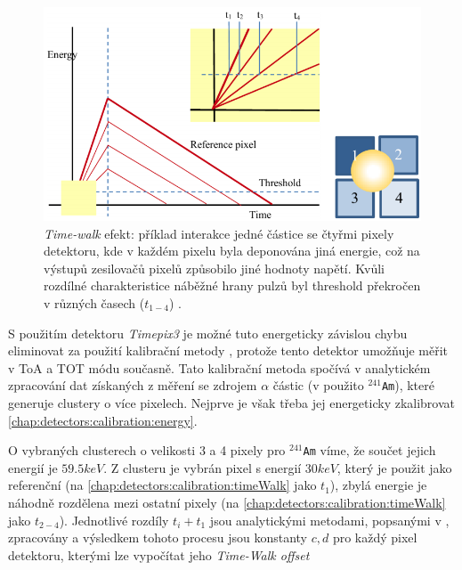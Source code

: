 \begin{figure}
	\begin{center}
		\includegraphics[width=12cm]{figures/calib_timeWalk.png}
		\caption{\textit{Time-walk} efekt: příklad interakce jedné částice se čtyřmi pixely detektoru, kde v každém pixelu byla deponována jiná energie, což na výstupů zesilovačů pixelů způsobilo jiné hodnoty napětí. Kvůli rozdílné charakteristice náběžné hrany pulzů byl threshold překročen v různých časech ($t_{1-4}$) \cite{Turecek2016TimeWakl}.}
		\label{fig:det:calib:timeWalk}
	\end{center}
\end{figure}

S použitím detektoru \textit{Timepix3} je možné tuto energeticky závislou chybu eliminovat za použití kalibrační metody \cite{Turecek2016TimeWakl}, protože tento detektor umožňuje měřit v ToA a TOT módu současně. Tato kalibrační metoda spočívá v analytickém zpracování dat získaných z měření se zdrojem $\alpha$ částic (v \cite{Turecek2016TimeWakl} použito $^{241}$\texttt{Am}), které generuje clustery o více pixelech. Nejprve je však třeba jej energeticky zkalibrovat \ref{chap:detectors:calibration:energy}. 

O vybraných clusterech o velikosti 3 a 4 pixely pro $^{241}$\texttt{Am} víme, že součet jejich energií je $59.5keV$. Z clusteru je vybrán pixel s energií $30keV$, který je použit jako referenční (na \ref{chap:detectors:calibration:timeWalk} jako $t_1$), zbylá energie je náhodně rozdělena mezi ostatní pixely (na \ref{chap:detectors:calibration:timeWalk} jako $t_{2-4}$). Jednotlivé rozdíly $t_i+t_1$ jsou analytickými metodami, popsanými v \cite{Turecek2016TimeWakl}, zpracovány a výsledkem tohoto procesu jsou konstanty $c,d$ pro každý pixel detektoru, kterými lze vypočítat jeho \textit{Time-Walk offset}

